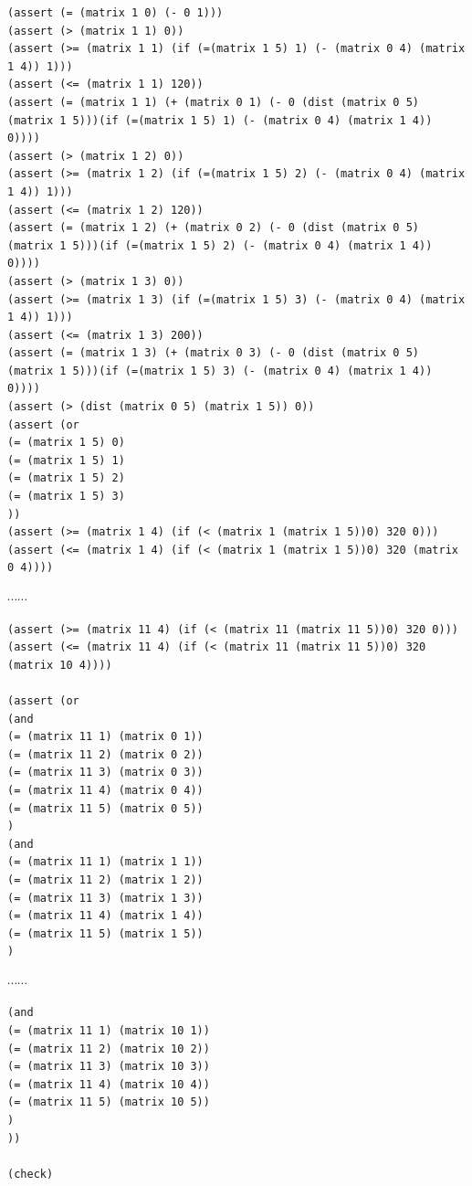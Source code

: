 \documentclass[12pt]{article}
\begin{document}
{{\begin{verbatim}
(assert (= (matrix 1 0) (- 0 1)))
(assert (> (matrix 1 1) 0))
(assert (>= (matrix 1 1) (if (=(matrix 1 5) 1) (- (matrix 0 4) (matrix 1 4)) 1)))
(assert (<= (matrix 1 1) 120))
(assert (= (matrix 1 1) (+ (matrix 0 1) (- 0 (dist (matrix 0 5) (matrix 1 5)))(if (=(matrix 1 5) 1) (- (matrix 0 4) (matrix 1 4)) 0))))
(assert (> (matrix 1 2) 0))
(assert (>= (matrix 1 2) (if (=(matrix 1 5) 2) (- (matrix 0 4) (matrix 1 4)) 1)))
(assert (<= (matrix 1 2) 120))
(assert (= (matrix 1 2) (+ (matrix 0 2) (- 0 (dist (matrix 0 5) (matrix 1 5)))(if (=(matrix 1 5) 2) (- (matrix 0 4) (matrix 1 4)) 0))))
(assert (> (matrix 1 3) 0))
(assert (>= (matrix 1 3) (if (=(matrix 1 5) 3) (- (matrix 0 4) (matrix 1 4)) 1)))
(assert (<= (matrix 1 3) 200))
(assert (= (matrix 1 3) (+ (matrix 0 3) (- 0 (dist (matrix 0 5) (matrix 1 5)))(if (=(matrix 1 5) 3) (- (matrix 0 4) (matrix 1 4)) 0))))
(assert (> (dist (matrix 0 5) (matrix 1 5)) 0))
(assert (or
(= (matrix 1 5) 0)
(= (matrix 1 5) 1)
(= (matrix 1 5) 2)
(= (matrix 1 5) 3)
))
(assert (>= (matrix 1 4) (if (< (matrix 1 (matrix 1 5))0) 320 0)))
(assert (<= (matrix 1 4) (if (< (matrix 1 (matrix 1 5))0) 320 (matrix 0 4))))
\end{verbatim}
$\cdots \cdots$ 
\begin{verbatim}
(assert (>= (matrix 11 4) (if (< (matrix 11 (matrix 11 5))0) 320 0)))
(assert (<= (matrix 11 4) (if (< (matrix 11 (matrix 11 5))0) 320 (matrix 10 4))))

(assert (or
(and
(= (matrix 11 1) (matrix 0 1))
(= (matrix 11 2) (matrix 0 2))
(= (matrix 11 3) (matrix 0 3))
(= (matrix 11 4) (matrix 0 4))
(= (matrix 11 5) (matrix 0 5))
)
(and
(= (matrix 11 1) (matrix 1 1))
(= (matrix 11 2) (matrix 1 2))
(= (matrix 11 3) (matrix 1 3))
(= (matrix 11 4) (matrix 1 4))
(= (matrix 11 5) (matrix 1 5))
)
\end{verbatim}
$\cdots \cdots$ 
\begin{verbatim}
(and
(= (matrix 11 1) (matrix 10 1))
(= (matrix 11 2) (matrix 10 2))
(= (matrix 11 3) (matrix 10 3))
(= (matrix 11 4) (matrix 10 4))
(= (matrix 11 5) (matrix 10 5))
)
))

(check)
\end{verbatim}
}

}
\end{document}
